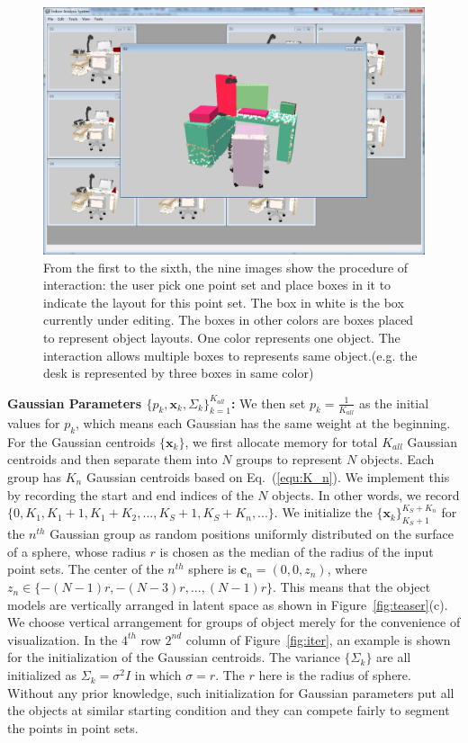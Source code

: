 \begin{figure}
	\includegraphics[width=.3\linewidth]{images/interact06.png}
	\caption{\label{fig:interact}
		From the first to the sixth, the nine images show the procedure of interaction:
		the user pick one point set and place boxes in it to indicate the layout for this point set. The box in white is the box currently under editing. The boxes in other colors are boxes placed to represent object layouts. One color represents one object. The interaction allows multiple boxes to represents same object.(e.g. the desk is represented by three boxes in same color)}
\end{figure}

\noindent\textbf{Gaussian Parameters $\{p_k,\mathbf{x}_k,\Sigma_k\}_{k=1}^{K_{all}}$:}
We then set $p_k=\frac{1}{K_{all}}$ as the initial values for $p_k$, which means each Gaussian has the same weight at the beginning. For the Gaussian centroids $\{\mathbf{x}_k\}$, we first allocate memory for total $K_{all}$ Gaussian centroids and then separate them into $N$ groups to represent $N$ objects. Each group has $K_n$ Gaussian centroids based on Eq.~(\ref{equ:K_n}). We implement this by recording the start and end indices of the $N$ objects. In other words, we record $\{0,K_1,K_1+1,K_1+K_2,...,K_S+1,K_S+K_n,...\}$. We initialize the $\{\mathbf{x}_k\}_{K_S+1}^{K_S+K_n}$ for the $n^{th}$ Gaussian group as random positions uniformly distributed on the surface of a sphere, whose radius $r$ is chosen as the median of the radius of the input point sets. 
%
The center of the $n^{th}$ sphere is $\mathbf{c}_n=(0,0,z_n)$, where $z_n\in \{-(N-1)r,-(N-3)r,...,(N-1)r\}$.
%
This means that the object models are vertically arranged in latent space as shown in Figure~\ref{fig:teaser}(c). 
We choose vertical arrangement for groups of object merely for the convenience of visualization.
In the $4^{th}$ row $2^{nd}$ column of Figure~\ref{fig:iter}, an example is shown for the initialization of the Gaussian centroids.
%
The variance $\{\Sigma_k\}$ are all initialized as $\Sigma_k=\sigma^2 I$ in which $\sigma=r$.
The $r$ here is the radius of sphere. Without any prior knowledge, such initialization for Gaussian parameters put all the objects at similar starting condition and they can compete fairly to segment the points in point sets.   

